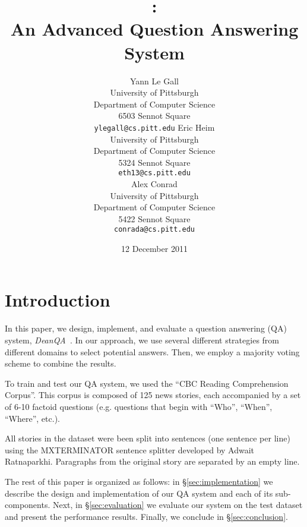 \documentclass[11pt,letterpaper]{article}
\title{\name: \\An Advanced Question Answering System}
\author{
	Yann Le Gall\\
    University of Pittsburgh\\	
	Department of Computer Science\\
	6503 Sennot Square\\
    {\tt ylegall@cs.pitt.edu}
\And
	Eric Heim\\
    University of Pittsburgh\\	
    Department of Computer Science\\
	5324 Sennot Square\\
    {\tt eth13@cs.pitt.edu}
	\\
\And
	Alex Conrad\\
    University of Pittsburgh\\
    Department of Computer Science\\
    5422 Sennot Square\\
    {\tt conrada@cs.pitt.edu}
}
\date{12 December 2011}
\newcommand{\name}{\emph{DeanQA~}}
\begin{document}
\maketitle





\section{Introduction}
\label{sec:intro}
\paragraph{}
In this paper, we design, implement, and evaluate a question answering
(QA) system, \name. In our approach, we use several different strategies from
different domains to select potential answers. Then, we employ a
majority voting scheme to combine the results.

To train and test our QA system, we used the ``CBC Reading
Comprehension Corpus''. This corpus is composed of 125 news stories,
each accompanied by a set of 6-10 factoid questions (e.g. questions
that begin with ``Who'', ``When'', ``Where'', etc.).

All stories in the dataset were been split into sentences (one
sentence per line) using the MXTERMINATOR sentence splitter developed
by Adwait Ratnaparkhi.  Paragraphs from the original story are
separated by an empty line. 

The rest of this paper is organized as follows: in
\S\ref{sec:implementation} we describe the design and implementation
of our QA system and each of its sub-components. Next, in
\S\ref{sec:evaluation} we evaluate our system on the test dataset and
present the performance results. Finally, we conclude in
\S\ref{sec:conclusion}.
\end{document}
